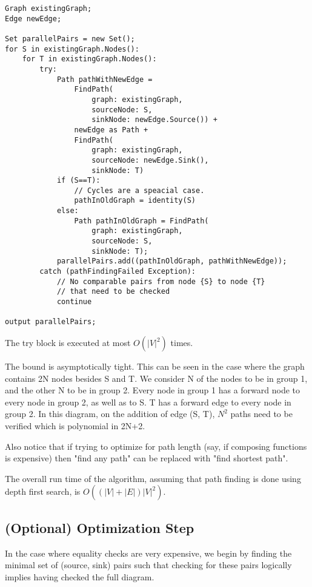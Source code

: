 \documentclass[runningheads]{llncs}
\begin{document}
\begin{verbatim}
Graph existingGraph;
Edge newEdge;

Set parallelPairs = new Set();
for S in existingGraph.Nodes():
    for T in existingGraph.Nodes():
        try:
            Path pathWithNewEdge = 
                FindPath(
                    graph: existingGraph, 
                    sourceNode: S,
                    sinkNode: newEdge.Source()) +
                newEdge as Path +
                FindPath(
                    graph: existingGraph, 
                    sourceNode: newEdge.Sink(), 
                    sinkNode: T)
            if (S==T):
                // Cycles are a speacial case.
                pathInOldGraph = identity(S)
            else:
                Path pathInOldGraph = FindPath(
                    graph: existingGraph, 
                    sourceNode: S, 
                    sinkNode: T);
            parallelPairs.add((pathInOldGraph, pathWithNewEdge));
        catch (pathFindingFailed Exception):
            // No comparable pairs from node {S} to node {T} 
            // that need to be checked
            continue

output parallelPairs;
\end{verbatim}

The try block is executed at most $O(|V|^2)$ times.

The bound is asymptotically tight. This can be seen in the case where the graph contains 2N nodes besides S and T. We consider N of the nodes to be in group 1, and the other N to be in group 2. Every node in group 1 has a forward node to every node in group 2, as well as to S. T has a forward edge to every node in group 2. In this diagram, on the addition of edge (S, T), $N^2$ paths need to be verified which is polynomial in 2N+2.

Also notice that if trying to optimize for path length (say, if composing functions is expensive) then "find any path" can be replaced with "find shortest path".

The overall run time of the algorithm, assuming that path finding is done using depth first search, is $O((|V|+|E|)|V|^2)$.

\subsection{(Optional) Optimization Step}

In the case where equality checks are very expensive, we begin by finding the minimal set of (source, sink) pairs such that checking for these pairs logically implies having checked the full diagram.
\end{document}
